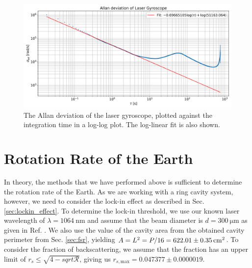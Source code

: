 \documentclass[a4paper]{report}
\numberwithin{equation}{section}
\begin{document}
\begin{figure}[h!]
	\centering
	\includegraphics[width=0.8\columnwidth]{allan.png}
	\caption{The Allan deviation of the laser gyroscope, plotted against the integration time in a log-log plot. The log-linear fit
	is also shown.}
	\label{fig:allan}
\end{figure}



\section{Rotation Rate of the Earth}

In theory, the methods that we have performed above is sufficient to determine the rotation rate of the Earth. As we are 
working with a ring cavity system, however, we need to consider the lock-in effect as described in Sec. \ref{sec:lockin_effect}. 
To determine the lock-in threshold, we use our known laser wavelength of $\lambda = \SI{1064}{\nano\metre}$ and assume that the
 beam diameter is $d = \SI{300}{\micro\metre}$ as given in Ref. \cite{Groh2021}.
We also use the value of the cavity area from the obtained cavity perimeter from Sec. \ref{sec:fsr}, yielding
$A = L^2 = P / 16 = \SI{622.01 \pm 0.35}{\centi\meter\squared}$. To consider the fraction of backscattering, we assume that the 
fraction has an upper limit of $r_s \leq \sqrt{4 - sqrt{\mathcal{R}}}$, giving us $r_{s, \mathrm{max}} = 0.047377 \pm 0.0000019$. \par 
\end{document}
